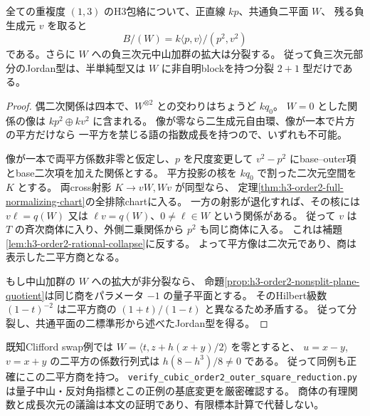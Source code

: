 \begin{theorem}[負三次元側の二平方商とJordan分裂]
\label{thm:h3-order2-two-square-quotient}
全ての重複度 $(1,3)$ のH3包絡について、正直線 $kp$、共通負二平面 $W$、
残る負生成元 $v$ を取ると
\[
 B/(W)=k\langle p,v\rangle/(p^2,v^2)
\]
である。さらに $W$ への負三次元中山加群の拡大は分裂する。
従って負三次元部分のJordan型は、半単純型又は $W$ に非自明blockを持つ分裂 $2+1$ 型だけである。
\end{theorem}
\begin{proof}
偶二次関係は四本で、$W^{\otimes2}$ との交わりはちょうど $kq_0$。
$W=0$ とした関係の像は $kp^2\oplus kv^2$ に含まれる。
像が零なら二生成元自由環、像が一本で片方の平方だけなら
一平方を禁じる語の指数成長を持つので、いずれも不可能。

像が一本で両平方係数非零と仮定し、$p$ を尺度変更して
$v^2-p^2$ にbase--outer項とbase二次項を加えた関係とする。
平方投影の核を $kq_0$ で割った二次元空間を $K$ とする。
両cross射影 $K\to vW,Wv$ が同型なら、
定理\ref{thm:h3-order2-full-normalizing-chart}の全排除chartに入る。
一方の射影が退化すれば、その核には
$v\ell=q(W)$ 又は $\ell v=q(W)$、$0\ne\ell\in W$ という関係がある。
従って $v$ は $T$ の斉次商体に入り、外側二乗関係から $p^2$ も同じ商体に入る。
これは補題\ref{lem:h3-order2-rational-collapse}に反する。
よって平方像は二次元であり、商は表示した二平方商となる。

もし中山加群の $W$ への拡大が非分裂なら、
命題\ref{prop:h3-order2-nonsplit-plane-quotient}は同じ商をパラメータ $-1$ の量子平面とする。
そのHilbert級数 $(1-t)^{-2}$ は二平方商の $(1+t)/(1-t)$ と異なるため矛盾する。
従って分裂し、共通平面の二標準形から述べたJordan型を得る。
\end{proof}
既知Clifford swap例では $W=\langle t,z+h(x+y)/2\rangle$ を零とすると、
$u=x-y$, $v=x+y$ の二平方の係数行列式は $h(8-h^3)/8\ne0$ である。
従って同例も正確にこの二平方商を持つ。
\texttt{verify\_\allowbreak{}cubic\_\allowbreak{}order2\_\allowbreak{}outer\_\allowbreak{}square\_\allowbreak{}reduction.py}
は量子中山・反対角指標とこの正例の基底変更を厳密確認する。
商体の有理関数と成長次元の議論は本文の証明であり、有限標本計算で代替しない。

